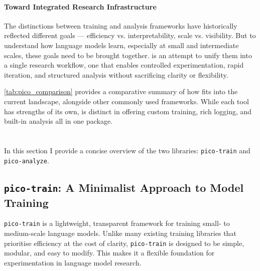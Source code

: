 
\paragraph{Toward Integrated Research Infrastructure}
The distinctions between training and analysis frameworks have historically reflected different goals --- efficiency vs. interpretability, scale vs. visibility. But to understand how language models learn, especially at small and intermediate scales, these goals need to be brought together. \pico is an attempt to unify them into a single research workflow, one that enables controlled experimentation, rapid iteration, and structured analysis without sacrificing clarity or flexibility.

\cref{tab:pico_comparison} provides a comparative summary of how \pico fits into the current landscape, alongside other commonly used frameworks. While each tool has strengths of its own, \pico is distinct in offering custom training, rich logging, and built-in analysis all in one package.

\section[\picomed]{\picolarge}
\label{sec:pico-overview}

In this section I provide a concise overview of the two \pico libraries: \texttt{pico-train} and \texttt{pico-analyze}. 

\subsection{\texttt{pico-train}: A Minimalist Approach to Model Training}

\texttt{pico-train} is a lightweight, transparent framework for training small- to medium-scale language models. Unlike many existing training libraries that prioritise efficiency at the cost of clarity, \texttt{pico-train} is designed to be simple, modular, and easy to modify. This makes it a flexible foundation for experimentation in language model research.

